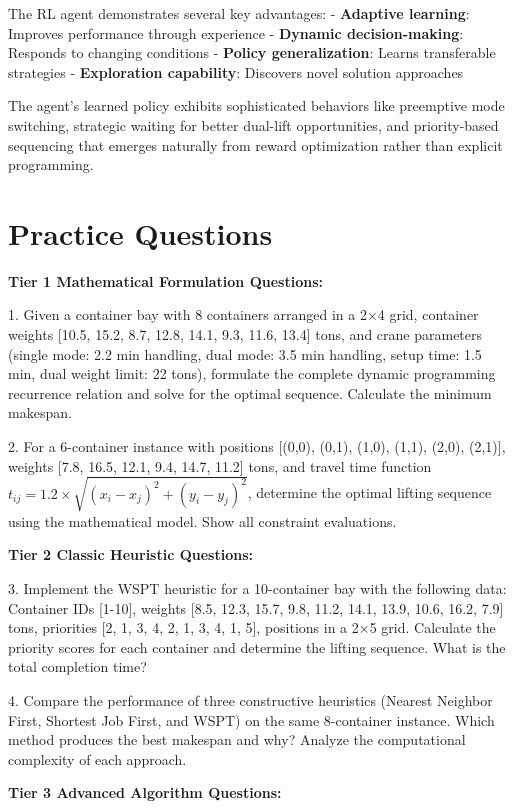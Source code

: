 \documentclass{article}
\begin{document}
The RL agent demonstrates several key advantages:
- \textbf{Adaptive learning}: Improves performance through experience
- \textbf{Dynamic decision-making}: Responds to changing conditions
- \textbf{Policy generalization}: Learns transferable strategies
- \textbf{Exploration capability}: Discovers novel solution approaches

The agent's learned policy exhibits sophisticated behaviors like preemptive mode switching, strategic waiting for better dual-lift opportunities, and priority-based sequencing that emerges naturally from reward optimization rather than explicit programming.

\section{Practice Questions}

\textbf{Tier 1 Mathematical Formulation Questions:}

1. Given a container bay with 8 containers arranged in a 2×4 grid, container weights [10.5, 15.2, 8.7, 12.8, 14.1, 9.3, 11.6, 13.4] tons, and crane parameters (single mode: 2.2 min handling, dual mode: 3.5 min handling, setup time: 1.5 min, dual weight limit: 22 tons), formulate the complete dynamic programming recurrence relation and solve for the optimal sequence. Calculate the minimum makespan.

2. For a 6-container instance with positions [(0,0), (0,1), (1,0), (1,1), (2,0), (2,1)], weights [7.8, 16.5, 12.1, 9.4, 14.7, 11.2] tons, and travel time function $t_{ij} = 1.2 \times \sqrt{(x_i-x_j)^2 + (y_i-y_j)^2}$, determine the optimal lifting sequence using the mathematical model. Show all constraint evaluations.

\textbf{Tier 2 Classic Heuristic Questions:}

3. Implement the WSPT heuristic for a 10-container bay with the following data: Container IDs [1-10], weights [8.5, 12.3, 15.7, 9.8, 11.2, 14.1, 13.9, 10.6, 16.2, 7.9] tons, priorities [2, 1, 3, 4, 2, 1, 3, 4, 1, 5], positions in a 2×5 grid. Calculate the priority scores for each container and determine the lifting sequence. What is the total completion time?

4. Compare the performance of three constructive heuristics (Nearest Neighbor First, Shortest Job First, and WSPT) on the same 8-container instance. Which method produces the best makespan and why? Analyze the computational complexity of each approach.

\textbf{Tier 3 Advanced Algorithm Questions:}
\end{document}
